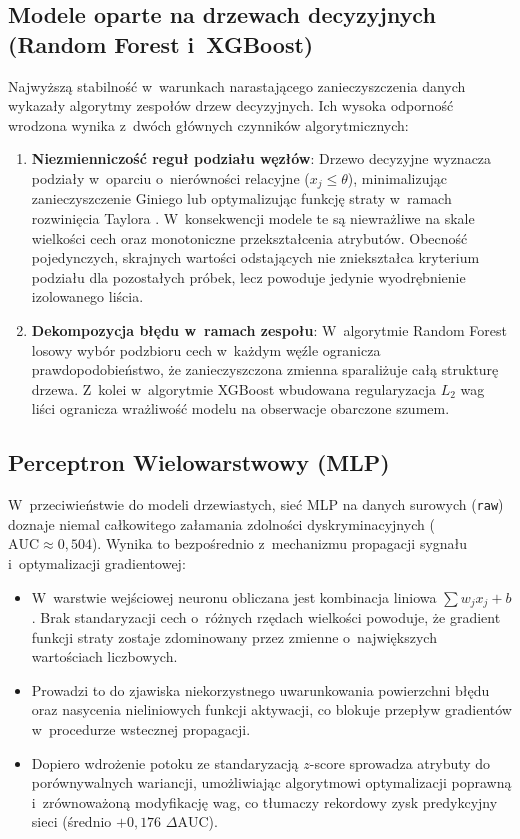 \subsection{Modele oparte na drzewach decyzyjnych (Random Forest i~XGBoost)}
Najwyższą stabilność w~warunkach narastającego zanieczyszczenia danych wykazały algorytmy zespołów drzew decyzyjnych. Ich wysoka odporność wrodzona wynika z~dwóch głównych czynników algorytmicznych:
\begin{enumerate}
    \item \textbf{Niezmienniczość reguł podziału węzłów}: Drzewo decyzyjne wyznacza podziały w~oparciu o~nierówności relacyjne ($x_j \le \theta$), minimalizując zanieczyszczenie Giniego lub optymalizując funkcję straty w~ramach rozwinięcia Taylora \cite{ChenGuestrin2016}. W~konsekwencji modele te są niewrażliwe na skale wielkości cech oraz monotoniczne przekształcenia atrybutów. Obecność pojedynczych, skrajnych wartości odstających nie zniekształca kryterium podziału dla pozostałych próbek, lecz powoduje jedynie wyodrębnienie izolowanego liścia.
    \item \textbf{Dekompozycja błędu w~ramach zespołu}: W~algorytmie Random Forest losowy wybór podzbioru cech w~każdym węźle \cite{Breiman2001} ogranicza prawdopodobieństwo, że zanieczyszczona zmienna sparaliżuje całą strukturę drzewa. Z~kolei w~algorytmie XGBoost wbudowana regularyzacja $L_2$ wag liści ogranicza wrażliwość modelu na obserwacje obarczone szumem.
\end{enumerate}

\subsection{Perceptron Wielowarstwowy (MLP)}
W~przeciwieństwie do modeli drzewiastych, sieć MLP na danych surowych (\texttt{raw}) doznaje niemal całkowitego załamania zdolności dyskryminacyjnych ($\mathrm{AUC} \approx 0{,}504$). Wynika to bezpośrednio z~mechanizmu propagacji sygnału i~optymalizacji gradientowej:
\begin{itemize}
    \item W~warstwie wejściowej neuronu obliczana jest kombinacja liniowa $\sum w_j x_j + b$. Brak standaryzacji cech o~różnych rzędach wielkości powoduje, że gradient funkcji straty zostaje zdominowany przez zmienne o~największych wartościach liczbowych.
    \item Prowadzi to do zjawiska niekorzystnego uwarunkowania powierzchni błędu oraz nasycenia nieliniowych funkcji aktywacji, co blokuje przepływ gradientów w~procedurze wstecznej propagacji.
    \item Dopiero wdrożenie potoku ze standaryzacją $z$-score \cite{Walker2021} sprowadza atrybuty do porównywalnych wariancji, umożliwiając algorytmowi optymalizacji poprawną i~zrównoważoną modyfikację wag, co tłumaczy rekordowy zysk predykcyjny sieci (średnio $+0{,}176$ $\Delta\mathrm{AUC}$).
\end{itemize}

